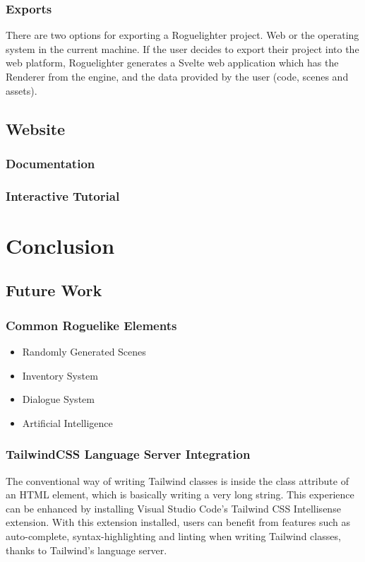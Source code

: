 \documentclass{article}
\begin{document}
\subsubsection{Exports}
There are two options for exporting a Roguelighter project. Web or the operating system in the current machine. If the user decides to export their project into the web platform, Roguelighter generates a Svelte web application which has the Renderer from the engine, and the data provided by the user (code, scenes and assets). 

\subsection{Website}
\subsubsection{Documentation}
\subsubsection{Interactive Tutorial}

\section{Conclusion}
\subsection{Future Work}
\subsubsection{Common Roguelike Elements}
\begin{itemize}
    \item{Randomly Generated Scenes}
    \item{Inventory System}
    \item{Dialogue System}
    \item{Artificial Intelligence}
\end{itemize}
\subsubsection{TailwindCSS Language Server Integration}
The conventional way of writing Tailwind classes is inside the class attribute of an HTML element, which is basically writing a very long string. This experience can be enhanced by installing Visual Studio Code's Tailwind CSS Intellisense extension. With this extension installed, users can benefit from features such as auto-complete, syntax-highlighting and linting when writing Tailwind classes, thanks to Tailwind's language server.\\
\end{document}
